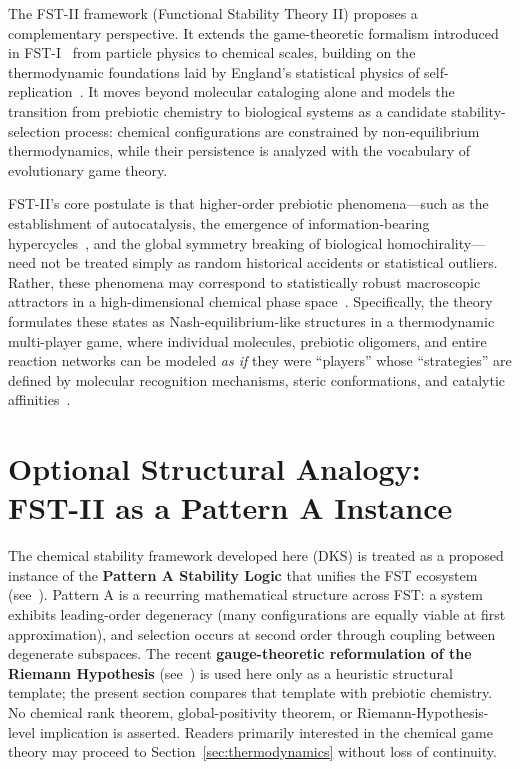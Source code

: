 \documentclass[12pt,a4paper]{article}
\theoremstyle{remark}
\begin{document}
The FST-II framework (Functional Stability Theory II) proposes a complementary perspective. It extends the game-theoretic formalism introduced in FST-I~\citep{FSTI} from particle physics to chemical scales, building on the thermodynamic foundations laid by England's statistical physics of self-replication~\citep{England2013}. It moves beyond molecular cataloging alone and models the transition from prebiotic chemistry to biological systems as a candidate stability-selection process: chemical configurations are constrained by non-equilibrium thermodynamics, while their persistence is analyzed with the vocabulary of evolutionary game theory.

FST-II's core postulate is that higher-order prebiotic phenomena---such as the establishment of autocatalysis, the emergence of information-bearing hypercycles~\citep{Eigen1979}, and the global symmetry breaking of biological homochirality---need not be treated simply as random historical accidents or statistical outliers. Rather, these phenomena may correspond to statistically robust macroscopic attractors in a high-dimensional chemical phase space~\citep{ReplicatorEntropy}. Specifically, the theory formulates these states as Nash-equilibrium-like structures in a thermodynamic multi-player game, where individual molecules, prebiotic oligomers, and entire reaction networks can be modeled \emph{as if} they were ``players'' whose ``strategies'' are defined by molecular recognition mechanisms, steric conformations, and catalytic affinities~\citep{CGT2018,CGTMacmillan}.

\section[Optional Structural Analogy: FST-II as a Pattern A Instance]{Optional Structural Analogy:\protect\\FST-II as a Pattern A Instance}
\label{sec:structural-alignment}

The chemical stability framework developed here (DKS) is treated as a proposed instance of the \textbf{Pattern A Stability Logic} that unifies the FST ecosystem (see~\cite{FST-Unified2026}). Pattern A is a recurring mathematical structure across FST: a system exhibits leading-order degeneracy (many configurations are equally viable at first approximation), and selection occurs at second order through coupling between degenerate subspaces. The recent \textbf{gauge-theoretic reformulation of the Riemann Hypothesis} (see~\cite{GeigerRH2026c}) is used here only as a heuristic structural template; the present section compares that template with prebiotic chemistry. No chemical rank theorem, global-positivity theorem, or Riemann-Hypothesis-level implication is asserted. Readers primarily interested in the chemical game theory may proceed to Section~\ref{sec:thermodynamics} without loss of continuity.
\end{document}
